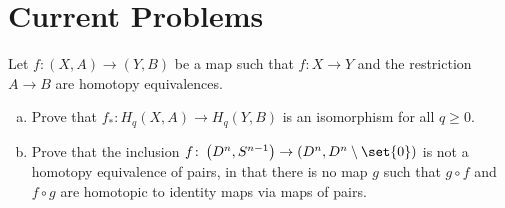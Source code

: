 \documentclass[10pt]{mypackage}
\begin{document}
\section{Current Problems}%
\begin{problem}[Problem 1]
  Let $f\colon \left( X,A \right)\rightarrow \left( Y,B \right)$ be a map such that $f\colon X\rightarrow Y$ and the restriction $A\rightarrow B$ are homotopy equivalences.
  \begin{enumerate}[(a)]
    \item Prove that $f_{\ast}\colon H_q\left( X,A \right)\rightarrow H_q\left( Y,B \right)$ is an isomorphism for all $q\geq 0$.
    \item Prove that the inclusion $f\colon \left( D^n,S^{n-1} \right)\rightarrow \left( D^n,D^n\setminus \set{0} \right)$ is not a homotopy equivalence of pairs, in that there is no map $g$ such that $g\circ f$ and $f\circ g$ are homotopic to identity maps via maps of pairs.
  \end{enumerate}
\end{problem}
\end{document}
